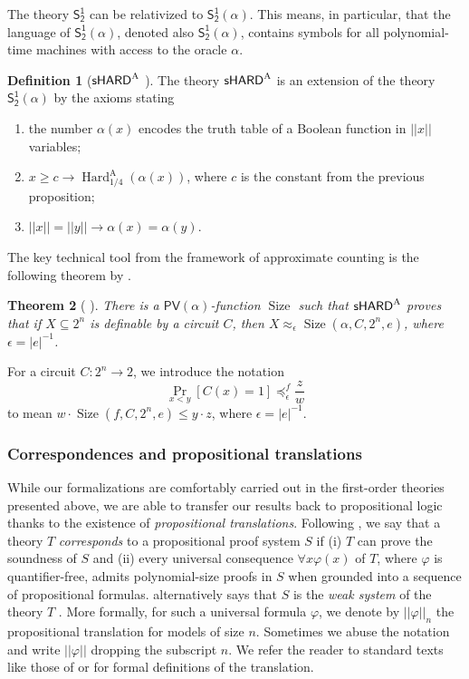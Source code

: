 \documentclass[11pt]{article}
\newcommand{\SOT}{\mathsf{S^1_2}}
\renewcommand{\PV}{\mathsf{PV}}
\newcommand{\trans}[1]{||#1||}
\newcommand{\setsize}{\operatorname{Size}}
\theoremstyle{definition}
\newtheorem{definition}{Definition}[section]
\theoremstyle{plain}
\newtheorem{theorem}[definition]{Theorem}
\theoremstyle{remark}
\begin{document}
The theory $\SOT$ can be relativized to $\SOT(\alpha)$. This means, in particular, that the language of $\SOT(\alpha)$, denoted also $\SOT(\alpha)$, contains symbols for all polynomial-time machines with access to the oracle $\alpha$.

\begin{definition}[${\sf sHARD}^{\text{A}}$ \cite{Jer04-Dual}] The theory ${\sf sHARD}^{\text{A}}$ is an extension of the theory $\SOT(\alpha)$ by the axioms stating
\begin{enumerate}
    \item the number $\alpha(x)$ encodes the truth table of a Boolean function in $||x||$ variables;
    \item $x\geq c\rightarrow \operatorname{Hard}^\text{A}_{1/4}(\alpha(x))$, where $c$ is the constant from the previous proposition;
    \item $||x||=||y||\rightarrow \alpha(x)=\alpha(y)$. 
\end{enumerate}
\end{definition}

The key technical tool from the framework of approximate counting is the following theorem by \citeauthor{Jer07}.

\begin{theorem}[\citeauthor{Jer07} \cite{Jer07}]\label{thm:emil-master}There is a $\PV(\alpha)$-function $\setsize$ such that ${\sf sHARD}^{\text{A}}$ proves that if $X\subseteq 2^n$ is definable by a circuit $C$, then $X\approx_{\epsilon} \setsize(\alpha, C,2^n,e)$, where $\epsilon=|e|^{-1}$.
\end{theorem} 

For a circuit $C : 2^n \to 2$, we introduce the notation
$$\Pr_{x < y}[C(x) = 1] \preceq_\epsilon^f \frac{z}{w}$$
to mean $w \cdot \setsize(f, C, 2^n, e) \leq y \cdot z$, where $\epsilon = |e|^{-1}$.

\subsubsection{Correspondences and propositional translations}\label{ss:proptran}
While our formalizations are comfortably carried out in the first-order theories presented above, we are able to transfer our results back to propositional logic thanks to the existence of \emph{propositional translations}. Following \citeauthor{krajicekBOOK} \cite{krajicekBOOK}, we say that a theory $T$ \emph{corresponds} to a propositional proof system $S$ if (i) $T$ can prove the soundness of $S$ and (ii) every universal consequence $\forall x \varphi(x)$ of $T$, where $\varphi$ is quantifier-free, admits polynomial-size proofs in $S$ when grounded into a sequence of propositional formulas. \citeauthor{Pud20} alternatively says that $S$ is the \emph{weak system} of the theory $T$ \cite{Pud20}. More formally, for such a universal formula $\varphi$, we denote by $\trans{\varphi}_n$ the propositional translation for models of size $n$. Sometimes we abuse the notation and write $\trans{\varphi}$ dropping the subscript $n$. We refer the reader to standard texts like those of \citeauthor{krajicekBOOK} \cite{krajicekBOOK} or \citeauthor{cookBOOK} \cite{cookBOOK} for formal definitions of the translation.
\end{document}
